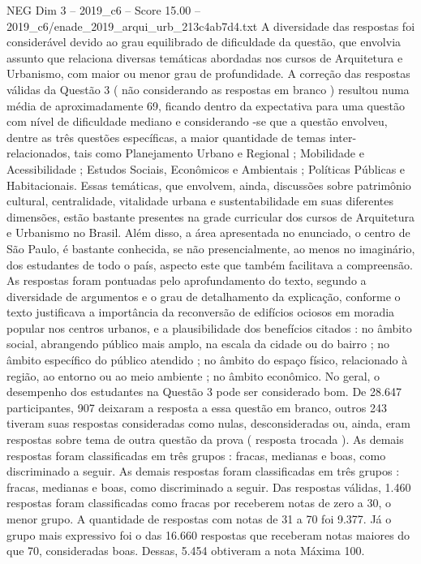 \begin{textsample}{NEG Dim 3 – 2019\_c6 – Score 15.00 – 2019\_c6/enade\_2019\_arqui\_urb\_213c4ab7d4.txt}
A diversidade das respostas foi considerável devido ao grau equilibrado de dificuldade da questão, que envolvia assunto que relaciona diversas temáticas abordadas nos cursos de Arquitetura e Urbanismo, com maior ou menor grau de profundidade.
A correção das respostas válidas da Questão 3 ( não considerando as respostas em branco ) resultou numa média de aproximadamente 69, ficando dentro da expectativa para uma questão com nível de dificuldade mediano e considerando -se que a questão envolveu, dentre as três questões específicas, a maior quantidade de temas inter-relacionados, tais como Planejamento Urbano e Regional ; Mobilidade e Acessibilidade ; Estudos Sociais, Econômicos e Ambientais ; Políticas Públicas e Habitacionais.
Essas temáticas, que envolvem, ainda, discussões sobre patrimônio cultural, centralidade, vitalidade urbana e sustentabilidade em suas diferentes dimensões, estão bastante presentes na grade curricular dos cursos de Arquitetura e Urbanismo no Brasil.
Além disso, a área apresentada no enunciado, o centro de São Paulo, é bastante conhecida, se não presencialmente, ao menos no imaginário, dos estudantes de todo o país, aspecto este que também facilitava a compreensão.
As respostas foram pontuadas pelo aprofundamento do texto, segundo a diversidade de argumentos e o grau de detalhamento da explicação, conforme o texto justificava a importância da reconversão de edifícios ociosos em moradia popular nos centros urbanos, e a plausibilidade dos benefícios citados : no âmbito social, abrangendo público mais amplo, na escala da cidade ou do bairro ; no âmbito específico do público atendido ; no âmbito do espaço físico, relacionado à região, ao entorno ou ao meio ambiente ; no âmbito econômico.
No geral, o desempenho dos estudantes na Questão 3 pode ser considerado bom.
De 28.647 participantes, 907 deixaram a resposta a essa questão em branco, outros 243 tiveram suas respostas consideradas como nulas, desconsideradas ou, ainda, eram respostas sobre tema de outra questão da prova ( resposta trocada ).
As demais respostas foram classificadas em três grupos : fracas, medianas e boas, como discriminado a seguir.
As demais respostas foram classificadas em três grupos : fracas, medianas e boas, como discriminado a seguir.
Das respostas válidas, 1.460 respostas foram classificadas como fracas por receberem notas de zero a 30, o menor grupo.
A quantidade de respostas com notas de 31 a 70 foi 9.377.
Já o grupo mais expressivo foi o das 16.660 respostas que receberam notas maiores do que 70, consideradas boas.
Dessas, 5.454 obtiveram a nota Máxima 100.

\end{textsample}
